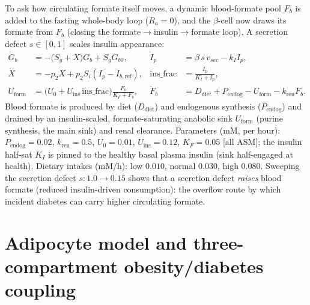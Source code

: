 \documentclass[11pt]{article}
\begin{document}
To ask how circulating formate itself moves, a dynamic blood-formate pool $F_b$ is
added to the fasting whole-body loop ($R_a=0$), and the $\beta$-cell now draws its
formate from $F_b$ (closing the formate$\to$insulin$\to$formate loop). A secretion
defect $s\in[0,1]$ scales insulin appearance:
\begin{align}
\dot G_b&=-\big(S_g+X\big)G_b+S_g G_{b0}, &
\dot I_p&=\beta\,s\,v_{sec}-k_I I_p,\\
\dot X&=-p_2X+p_2S_i(I_p-I_{b,\mathrm{ref}}), &
\mathrm{ins\_frac}&=\tfrac{I_p}{K_I+I_p},\\
U_{\mathrm{form}}&=\big(U_0+U_{\mathrm{ins}}\,\mathrm{ins\_frac}\big)\tfrac{F_b}{K_F+F_b}, &
\dot F_b&=D_{\mathrm{diet}}+P_{\mathrm{endog}}-U_{\mathrm{form}}-k_{\mathrm{ren}}F_b.
\end{align}
Blood formate is produced by diet ($D_{\mathrm{diet}}$) and endogenous synthesis
($P_{\mathrm{endog}}$) and drained by an insulin-scaled, formate-saturating
anabolic sink $U_{\mathrm{form}}$ (purine synthesis, the main sink) and renal
clearance. Parameters (mM, per hour): $P_{\mathrm{endog}}=0.02$, $k_{\mathrm{ren}}=0.5$,
$U_0=0.01$, $U_{\mathrm{ins}}=0.12$, $K_F=0.05$ [all ASM]; the insulin half-sat
$K_I$ is pinned to the healthy basal plasma insulin (sink half-engaged at health).
Dietary intakes (mM/h): low $0.010$, normal $0.030$, high $0.080$. Sweeping the
secretion defect $s:1.0\to0.15$ shows that a secretion defect \emph{raises} blood
formate (reduced insulin-driven consumption): the overflow route by which incident
diabetes can carry higher circulating formate.

\section{Adipocyte model and three-compartment obesity/diabetes coupling}\label{sec:adip}
\end{document}
